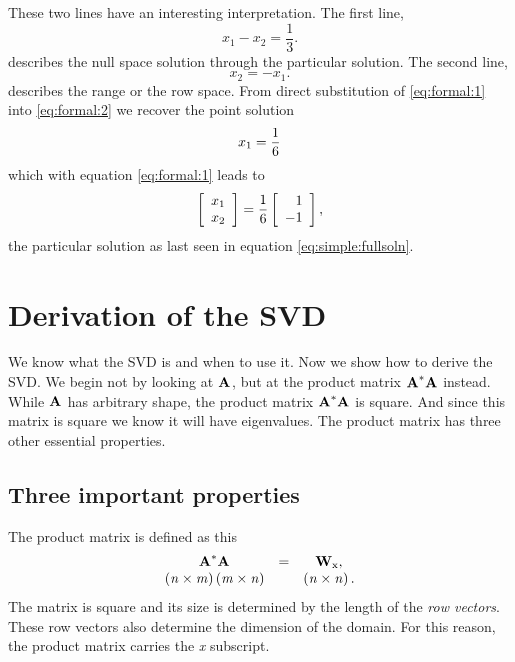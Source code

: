 These two lines have an interesting interpretation. The first line,
\begin{equation}
  x_{1} - x_{2} = \frac{1}{3}.
\label{eq:formal:2}
\end{equation}
describes the null space solution through the particular solution. The second line,
\begin{equation}
x_{2}=-x_{1}.
\label{eq:formal:1}
\end{equation}
describes the range or the row space.
From direct substitution of \eqref{eq:formal:1} into \eqref{eq:formal:2} we recover the point solution
\begin{equation}
  x_{1} = \rsix
\end{equation}
which with equation \eqref{eq:formal:1} leads to
\begin{equation}
  \mat{c}{x_{1} \\ x_{2}} = \frac{1}{6}\mat{r}{1\\-1},
\end{equation}
the particular solution as last seen in equation \eqref{eq:simple:fullsoln}.

%
%

\section{Derivation of the SVD}

We know what the SVD is and when to use it. Now we show how to derive the SVD. We begin not by looking at $\A{}$, but at the product matrix $\prdm{*}$  instead. While $\A{}$ has arbitrary shape, the product matrix  $\prdm{*}$  is square. And since this matrix is square we know it will have eigenvalues. The product matrix has three other essential properties.


\subsection{Three important properties}
\label{sec:moreformalbigthree}
The product matrix is defined as this
\begin{equation}
\begin{array}{ccc}
  \prdm{*} &=& \W{x},\\
  \paren{\byt{n}{m}}\paren{\byt{m}{n}} && \paren{\byt{n}{n}}.
\end{array}
\end{equation}
The matrix is square and its size is determined by the length of the \textit{row vectors}. These row vectors also determine the dimension of the domain. For this reason, the product matrix carries the \textit{x} subscript.

